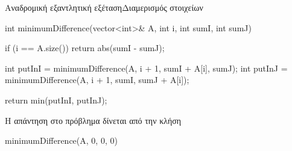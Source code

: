 \documentclass[t,aspectratio=169,9pt]{beamer}
\begin{document}
\begin{frame}[fragile]{Αναδρομική εξαντλητική εξέταση}{Διαμερισμός στοιχείων}
    \begin{cpp}
        int minimumDifference(vector<int>& A, int i, int sumI, int sumJ) 
        {
            if (i == A.size())
            {
                return abs(sumI - sumJ);
            }

            int putInI = minimumDifference(A, i + 1, sumI + A[i], sumJ);
            int putInJ = minimumDifference(A, i + 1, sumI, sumJ + A[i]);

            return min(putInI, putInJ);
        }
    \end{cpp}
    \pause
    \vspace{0.25cm}
    Η απάντηση στο πρόβλημα δίνεται από την κλήση
    \vspace{0.25cm}
    \begin{cpp}
        minimumDifference(A, 0, 0, 0)
    \end{cpp}
\end{frame}
\end{document}

